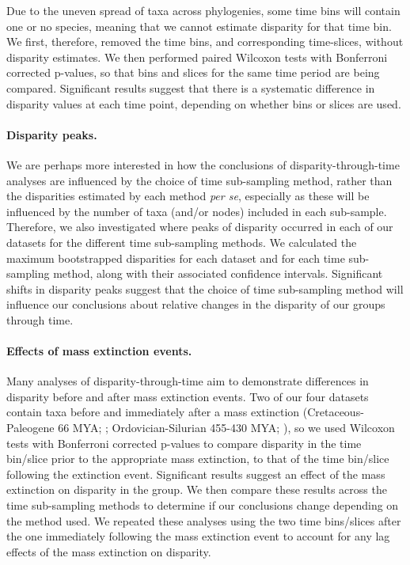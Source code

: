 \documentclass[12pt,a4paper]{article}
\begin{document}
Due to the uneven spread of taxa across phylogenies, some time bins will contain one or no species, meaning that we cannot estimate disparity for that time bin. 
We first, therefore, removed the time bins, and corresponding time-slices, without disparity estimates. 
We then performed paired Wilcoxon tests with Bonferroni corrected p-values, so that bins and slices for the same time period are being compared. 
Significant results suggest that there is a systematic difference in disparity values at each time point, depending on whether bins or slices are used.

\paragraph{Disparity peaks.}
We are perhaps more interested in how the conclusions of disparity-through-time analyses are influenced by the choice of time sub-sampling method, rather than the disparities estimated by each method \textit{per se}, especially as these will be influenced by the number of taxa (and/or nodes) included in each sub-sample. 
Therefore, we also investigated where peaks of disparity occurred in each of our datasets for the different time sub-sampling methods. 
We calculated the maximum bootstrapped disparities for each dataset and for each time sub-sampling method, along with their associated confidence intervals.
Significant shifts in disparity peaks suggest that the choice of time sub-sampling method will influence our conclusions about relative changes in the disparity of our groups through time. 

\paragraph{Effects of mass extinction events.}
Many analyses of disparity-through-time aim to demonstrate differences in disparity before and after mass extinction events. 
Two of our four datasets contain taxa before and immediately after a mass extinction (Cretaceous-Paleogene 66 MYA; \citealt{beckancient2014}; Ordovician-Silurian 455-430 MYA; \citealt{wright2017bayesian}), so we used Wilcoxon tests with Bonferroni corrected p-values to compare disparity in the time bin/slice prior to the appropriate mass extinction, to that of the time bin/slice following the extinction event. 
Significant results suggest an effect of the mass extinction on disparity in the group.
We then compare these results across the time sub-sampling methods to determine if our conclusions change depending on the method used.
We repeated these analyses using the two time bins/slices after the one immediately following the mass extinction event to account for any lag effects of the mass extinction on disparity.
\end{document}
